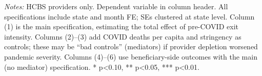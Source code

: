 
\begin{table}[htbp]
   \caption{\label{tab:main} Pre-COVID Provider Exits, Pandemic Disruption, and Beneficiary Consequences}
   \bigskip
   \centering

   \par \raggedright
   \textit{Notes:} HCBS providers only. Dependent variable in column header. All specifications include state and month FE; SEs clustered at state level. Column (1) is the main specification, estimating the total effect of pre-COVID exit intensity. Columns (2)--(3) add COVID deaths per capita and stringency as controls; these may be ``bad controls'' (mediators) if provider depletion worsened pandemic severity. Columns (4)--(6) use beneficiary-side outcomes with the main (no mediator) specification. * p<0.10, ** p<0.05, *** p<0.01.
\end{table}


